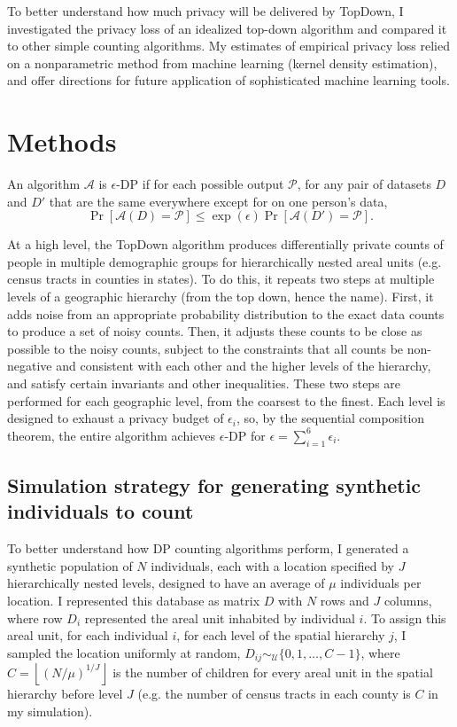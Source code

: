 \documentclass{article}
\begin{document}
To better understand how much privacy will be delivered by TopDown, I investigated the privacy loss of an idealized top-down algorithm and compared it to other simple counting algorithms.  My estimates of empirical privacy loss relied on a nonparametric method from machine learning (kernel density estimation), and offer directions for future application of sophisticated machine learning tools.

\section{Methods}
\label{methods}

An algorithm $\mathcal{A}$ is $\epsilon$-DP if for each possible output
$\mathcal{P}$, for any pair of datasets $D$ and $D'$ that are the same
everywhere except for on one person's data,
$$
\Pr\left[\mathcal{A}(D) = \mathcal{P}\right]
\leq \exp\left(\epsilon\right)
\Pr\left[\mathcal{A}(D') = \mathcal{P}\right].
$$

At a high level, the TopDown algorithm produces differentially private counts of people in multiple
demographic groups for hierarchically nested areal units (e.g. census tracts in counties in states).
To do this, it repeats two steps at multiple levels of a geographic
hierarchy (from the top down, hence the name). First,
it adds noise from an appropriate probability distribution
to the exact data counts to produce a set of noisy counts. Then, it adjusts
these counts to
be close as possible to the noisy counts, subject to the constraints
that all counts be non-negative and consistent with each other and the higher levels
of the hierarchy, and satisfy certain invariants and other inequalities.  These
two steps are performed for each geographic level, from the coarsest
to the finest.  Each level is designed to exhaust a privacy budget of $\epsilon_i$,
so, by the sequential composition theorem, 
the entire algorithm achieves $\epsilon$-DP for $\epsilon=\sum_{i=1}^6
\epsilon_i$.

\subsection{Simulation strategy for generating synthetic individuals to count}
To better understand how DP counting algorithms perform, I generated a synthetic population of $N$ individuals, each with a location specified by $J$ hierarchically nested levels, designed to have an average of $\mu$ individuals per location.
I represented this database as matrix $D$ with $N$ rows and $J$ columns, where row $D_i$ represented the areal unit inhabited by individual $i$.
To assign this areal unit, for each individual $i$, for each level of the spatial hierarchy $j$, I sampled the location uniformly at random, $D_{ij} \sim_{\mathcal{U}} \{0, 1, \ldots, C-1\}$, where $C = \left\lfloor \left(N/\mu\right)^{1/J} \right\rfloor$ is the number of children for every areal unit in the spatial hierarchy before level $J$ (e.g. the number of census tracts in each county is $C$ in my simulation).
\end{document}
